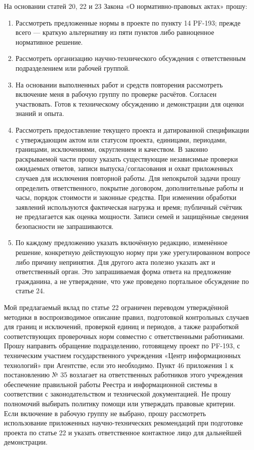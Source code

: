 \documentclass[14pt,a4paper]{extarticle}
\begin{document}
На основании статей 20, 22 и 23 Закона «О нормативно-правовых актах» прошу:
\begin{enumerate}
\item Рассмотреть предложенные нормы в проекте по пункту 14 PF-193; прежде всего — краткую альтернативу из пяти пунктов либо равноценное нормативное решение.
\item Рассмотреть организацию научно-технического обсуждения с ответственным подразделением или рабочей группой.
\item На основании выполненных работ и средств повторения рассмотреть включение меня в рабочую группу по проверке расчётов. Согласен участвовать. Готов к техническому обсуждению и демонстрации для оценки знаний и опыта.
\item Рассмотреть предоставление текущего проекта и датированной спецификации с утверждающим актом или статусом проекта, единицами, периодами, границами, исключениями, округлением и качеством. В законно раскрываемой части прошу указать существующие независимые проверки ожидаемых ответов, записи выпуска/согласования и охват приложенных случаев для исключения повторной работы. Для непокрытой задачи прошу определить ответственного, покрытие договором, дополнительные работы и часы, порядок стоимости и законные средства. При изменении обработки заявлений используются фактическая нагрузка и время; публичный счётчик не предлагается как оценка мощности. Записи семей и защищённые сведения безопасности не запрашиваются.
\item По каждому предложению указать включённую редакцию, изменённое решение, конкретную действующую норму при уже урегулированном вопросе либо причину непринятия. Для другого акта полезно указать акт и ответственный орган. Это запрашиваемая форма ответа на предложение гражданина, а не утверждение, что уже проведено портальное обсуждение по статье 24.
\end{enumerate}
Мой предлагаемый вклад по статье 22 ограничен переводом утверждённой методики в воспроизводимое описание правил, подготовкой контрольных случаев для границ и исключений, проверкой единиц и периодов, а также разработкой соответствующих проверочных норм совместно с ответственными работниками. Прошу направить обращение подразделению, готовящему проект по PF-193, с техническим участием государственного учреждения «Центр информационных технологий» при Агентстве, если это необходимо. Пункт 46 приложения 1 к постановлению № 35 возлагает на ответственных работников этого учреждения обеспечение правильной работы Реестра и информационной системы в соответствии с законодательством и технической документацией. Не прошу полномочий выбирать политику помощи или утверждать правовые критерии. Если включение в рабочую группу не выбрано, прошу рассмотреть использование приложенных научно-технических рекомендаций при подготовке проекта по статье 22 и указать ответственное контактное лицо для дальнейшей демонстрации.
\end{document}
